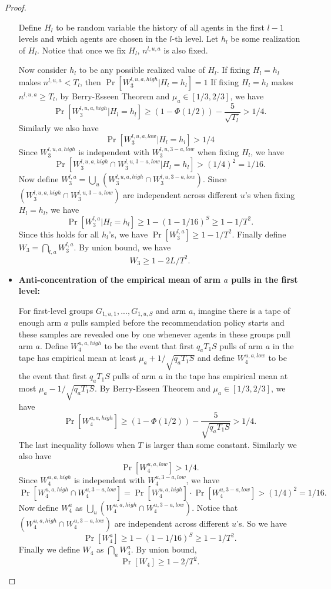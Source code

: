 \begin{proof}
\begin{itemize}
Define $H_l$ to be random variable the history of all agents in the first $l-1$ levels and which agents are chosen in the $l$-th level. Let $h_l$ be some realization of $H_l$. Notice that once we fix $H_l$, $n^{l,u,a}$ is also fixed. 

Now consider $h_l$ to be any possible realized value of $H_l$. If fixing $H_l= h_l$ makes $n^{l,u,a}<T_l$, then $\Pr[W_3^{l,u,a,high} |H_l = h_l]=1$  If fixing $H_l = h_l$ makes $n^{l,u,a} \geq T_l$, by Berry-Esseen Theorem and $\mu_a \in [1/3,2/3]$, we have
\[
\Pr[W_3^{l,u,a,high}|H_l = h_l] \geq (1-\Phi(1/2)) - \frac{5}{\sqrt{T_l}} > 1/4.
\]
Similarly we also have
\[
\Pr[W_3^{l,u,a,low}|H_l = h_l]  > 1/4
\]
Since $W_3^{l,u,a,high}$ is independent with $W_3^{l,u,3-a,low}$ when fixing $H_l$, we have
\[
\Pr[ W_3^{l,u,a,high} \cap W_3^{l,u,3-a,low}|H_l = h_l]  > (1/4)^2 = 1/16.
\]
Now define $W_3^{l,a} = \bigcup_u (W_3^{l,u,a,high} \cap W_3^{l,u,3-a,low})$. Since  $(W_3^{l,u,a,high} \cap W_3^{l,u,3-a,low})$ are independent across different $u$'s when fixing $H_l=h_l$, we have
\[
\Pr[W_3^{l,a}|H_l= h_l] \geq 1- (1-1/16)^S \geq 1 - 1/T^2.
\]
Since this holds for all $h_l$'s, we have $\Pr[W_3^{l,a}] \geq 1-1/T^2$. Finally define $W_3 = \bigcap_{l,a} W_3^{l,a}$. By union bound, we have
\[
W_3 \geq 1 - 2L/T^2.
\]

\item \textbf{Anti-concentration of the empirical mean of arm $a$ pulls in the first level:}

For first-level groups $G_{1,u,1},...,G_{1,u,S}$ and arm $a$, imagine there is a tape of enough arm $a$ pulls sampled before the recommendation policy starts and these samples are revealed one by one whenever agents in these groups pull arm $a$. Define $W_4^{u,a,high}$  to be the event that first $q_a T_1 S$ pulls of arm $a$ in the tape has empirical mean at least $\mu_a + 1/\sqrt{q_a T_1 S}$ and define $W_4^{u,a,low}$  to be the event that first $q_a T_1S$ pulls of arm $a$ in the tape has empirical mean at most $\mu_a - 1/\sqrt{q_a T_1S }$. By Berry-Esseen Theorem and $\mu_a \in [1/3,2/3]$, we have
\[
\Pr[W_4^{u,a,high}] \geq (1-\Phi(1/2)) - \frac{5}{\sqrt{q_aT_1S}} > 1/4.
\]
The last inequality follows when $T$ is larger than some constant.
Similarly we also have 
\[
\Pr[W_4^{u,a,low}] > 1/4.
\]
Since $W_4^{u,a,high}$ is independent with $W_4^{u,3-a,low}$, we have
\[
\Pr[W_4^{u,a,high} \cap W_4^{u,3-a,low}] =\Pr[W_4^{u,a,high}] \cdot  \Pr[W_4^{u,3-a,low}]>(1/4)^2 = 1/16.
\]
Now define $W^{a}_4$ as $\bigcup_u (W_4^{u,a,high} \cap W_4^{u,3-a,low})$. Notice that $(W_4^{u,a,high} \cap W_4^{u,3-a,low})$ are independent across different $u$'s. So we have
\[
\Pr[W^{a}_4] \geq 1- (1-1/16)^S \geq 1 -1/T^2.
\]
Finally we define $W_4$ as $\bigcap_{a} W^{a}_4$. By union bound,
\[
\Pr[W_4] \geq 1- 2/T^2.
\]
\end{itemize}


\end{proof}

